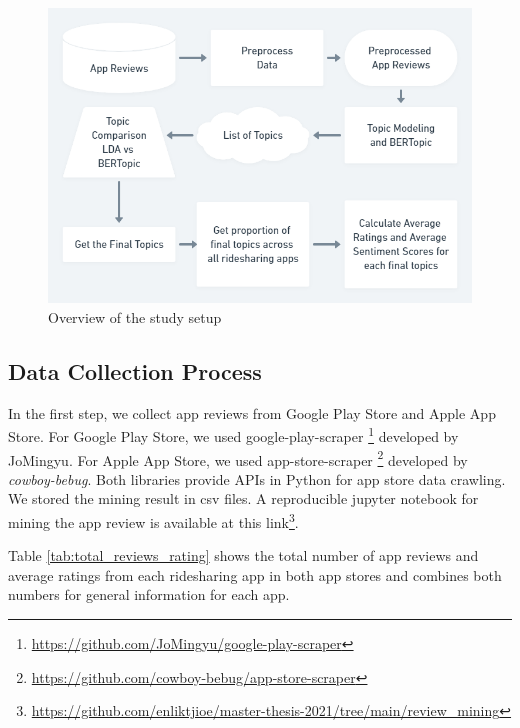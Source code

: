 \documentclass[12pt]{article}
\begin{document}
\begin{figure} [ht]
\begin{center}
\includegraphics[width=\textwidth]{figures/image2.png}
\caption{Overview of the study setup}
\label{fig:overview_of_study_setup}
\end{center}
\end{figure}


\subsection{Data Collection Process}
In the first step, we collect app reviews from Google Play Store and Apple App Store. For Google Play Store, we used google-play-scraper \footnote{\url{https://github.com/JoMingyu/google-play-scraper}} developed by JoMingyu. For Apple App Store, we used app-store-scraper \footnote{\url{https://github.com/cowboy-bebug/app-store-scraper}} developed by \textit{cowboy-bebug}. Both libraries provide APIs in Python for app store data crawling. We stored the mining result in csv files. A reproducible jupyter notebook for mining the app review is available at this link\footnote{\url{https://github.com/enliktjioe/master-thesis-2021/tree/main/review_mining}}. 

Table \ref{tab:total_reviews_rating} shows the total number of app reviews and average ratings from each ridesharing app in both app stores and combines both numbers for general information for each app. 
\end{document}
